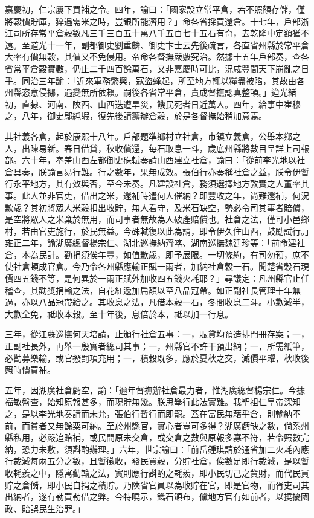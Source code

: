 \begin{pinyinscope}
嘉慶初，仁宗屢下買補之令。四年，諭曰：「國家設立常平倉，若不照額存儲，僅將穀價貯庫，猝遇需米之時，豈銀所能濟用？」命各省採買還倉。十七年，戶部浙江司所存常平倉穀數凡三千三百五十萬八千五百七十五石有奇，去乾隆中定額猶不遠。至道光十一年，副都御史劉重麟、御史卞士云先後疏言，各直省州縣於常平倉大率有價無穀，其價又不免侵用。帝命各督撫嚴覈究治。然據十五年戶部奏，查各省常平倉穀實數，仍止二千四百餘萬石，又非嘉慶時可比，況咸豐間天下崩亂之日乎。同治三年諭：「近來軍務繁興，寇盜蜂起，所至地方輒以糧盡被陷，其故由各州縣恣意侵挪，遇變無所依賴。嗣後各省常平倉，責成督撫認真整頓。」迨光緒初，直隸、河南、陜西、山西迭遭旱災，饑民死者日近萬人。四年，給事中崔穆之，八年，御史鄔純嘏，復先後請籌辦倉穀，於是各督撫始稍加意焉。

其社義各倉，起於康熙十八年。戶部題準鄉村立社倉，市鎮立義倉，公舉本鄉之人，出陳易新。春日借貸，秋收償還，每石取息一斗，歲底州縣將數目呈詳上司報部。六十年，奉差山西左都御史硃軾奏請山西建立社倉，諭曰：「從前李光地以社倉具奏，朕諭言易行難。行之數年，果無成效。張伯行亦奏稱社倉之益，朕令伊暫行永平地方，其有效與否，至今未奏。凡建設社倉，務須選擇地方敦實之人董率其事。此人並非官吏，借出之米，還補時遣何人催納？即豐收之年，尚難還補，何況歉歲？其初將眾人米穀扣出收貯，無人看守，及米石缺空，勢必令司其事者賠償，是空將眾人之米棄於無用，而司事者無故為人破產賠償也。社倉之法，僅可小邑鄉村，若由官吏施行，於民無益。今硃軾復以此為請，即令伊久住山西，鼓勵試行。」雍正二年，諭湖廣總督楊宗仁、湖北巡撫納齊喀、湖南巡撫魏廷珍等：「前命建社倉，本為民計。勸捐須俟年豐，如值歉歲，即予展限。一切條約，有司勿預，庶不使社倉頓成官倉。今乃令各州縣應輸正賦一兩者，加納社倉穀一石。聞楚省穀石現價四五錢不等，是何異於一兩正賦外加收四五錢火耗耶？」尋議定：凡州縣官止任稽查，其勸獎捐輸之法，自花紅遞加扁額以至八品冠帶。如正副社長管理十年無過，亦以八品冠帶給之。其收息之法，凡借本穀一石，冬間收息二斗。小歉減半，大歉全免，祗收本穀。至十年後，息倍於本，祗以加一行息。

三年，從江蘇巡撫何天培請，止頒行社倉五事：一，賑貸均預造排門冊存案；一，正副社長外，再舉一殷實者總司其事；一，州縣官不許干預出納；一，所需紙筆，必勸募樂輸，或官撥罰項充用；一，積穀既多，應於夏秋之交，減價平糶，秋收後照時價買補。

五年，因湖廣社倉虧空，諭：「邇年督撫辦社倉最力者，惟湖廣總督楊宗仁。今據福敏盤查，始知原報甚多，而現貯無幾。朕思舉行此法實難。我聖祖仁皇帝深知之，是以李光地奏請而未允，張伯行暫行而即罷。蓋在富民無藉乎倉，則輸納不前，而貧者又無餘粟可納。至於州縣官，實心者豈可多得？湖廣虧缺之數，倘系州縣私用，必嚴追賠補，或民間原未交倉，或交倉之數與原報多寡不符，若令照數完納，恐力未敷，須斟酌辦理。」六年，世宗諭曰：「前岳鍾琪請於通省加二火耗內應行裁減每兩五分之數，且暫徵收，發民買穀，分貯社倉，俟數足即行裁減，是以暫收耗羨之中，隱寓勸輸之法，實則應行斟酌之耗羨，即小民切己之貲財，而代民買貯之倉儲，即小民自捐之積貯。乃陜省官員以為收貯在官，即是官物，而胥吏司其出納者，遂有勒買勒借之弊。今特曉示，鐫石頒布，儻地方官有如前者，以撓擾國政、貽誤民生治罪。」


\end{pinyinscope}
